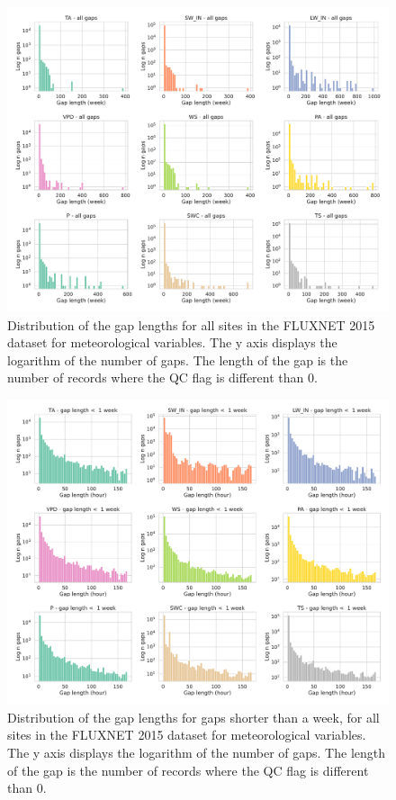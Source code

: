 \documentclass{article}
\newcommand{\imgwidth}{6in}
\begin{document}


\begin{figure}
\centerline{\includegraphics[width=\imgwidth]{gap_len_dist}}
\caption{Distribution of the gap lengths for all sites in the FLUXNET 2015 dataset for meteorological variables. The y axis displays the logarithm of the number of gaps. The length of the gap is the number of records where the QC flag is different than 0.}
\label{fig:gap_len_dist}
\end{figure}
\begin{figure}
\centerline{\includegraphics[width=\imgwidth]{gap_len_dist_small}}
\caption{Distribution of the gap lengths for gaps shorter than a week, for all sites in the FLUXNET 2015 dataset for meteorological variables. The y axis displays the logarithm of the number of gaps. The length of the gap is the number of records where the QC flag is different than 0.}
\label{fig:gap_len_dist_small}
\end{figure}
\end{document}
